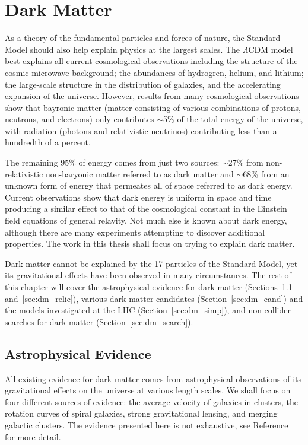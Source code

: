 \chapter{Dark Matter}
\label{sec:dm}

As a theory of the fundamental particles and forces of nature, the Standard Model should also help explain physics at the largest scales.
The $\Lambda$CDM model~\cite{Condon2018} best explains all current cosmological observations including the structure of the cosmic microwave background; the abundances of hydrogren, helium, and lithium; the large-scale structure in the distribution of galaxies, and the accelerating expansion of the universe.
However, results from many cosmological observations show that bayronic matter (matter consisting of various combinations of protons, neutrons, and electrons) only contributes $\sim$5\% of the total energy of the universe, with radiation (photons and relativistic neutrinos) contributing less than a hundredth of a percent.

The remaining 95\% of energy comes from just two sources: $\sim$27\% from non-relativistic non-baryonic matter referred to as dark matter and $\sim$68\% from an unknown form of energy that permeates all of space referred to as dark energy.
Current observations show that dark energy is uniform in space and time producing a similar effect to that of the cosmological constant in the Einstein field equations of general relavity.
Not much else is known about dark energy, although there are many experiments attempting to discover additional properties.
The work in this thesis shall focus on trying to explain dark matter.

Dark matter cannot be explained by the 17 particles of the Standard Model, yet its gravitational effects have been observed in many circumstances.
The rest of this chapter will cover the astrophysical evidence for dark matter (Sections~\ref{sec:dm_astro} and~\ref{sec:dm_relic}), various dark matter candidates (Section~\ref{sec:dm_cand}) and the models investigated at the LHC (Section~\ref{sec:dm_simp}), and non-collider searches for dark matter (Section~\ref{sec:dm_search}).

\section{Astrophysical Evidence}
\label{sec:dm_astro}

All existing evidence for dark matter comes from astrophysical observations of its gravitational effects on the universe at various length scales.
We shall focus on four different sources of evidence: the average velocity of galaxies in clusters, the rotation curves of spiral galaxies, strong gravitational lensing, and merging galactic clusters.
The evidence presented here is not exhaustive, see Reference~\cite{Roos2010} for more detail.

